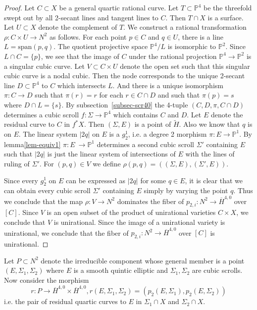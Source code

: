 \documentclass[amssymb,twoside,12 pt,amscd,reqno]{amsart}
\theoremstyle{plain}
\theoremstyle{definition}
\newcommand{\PP}{\mathbb{P}}
\def\ps{\vspace{4pt}}
\begin{document}
\begin{proof}
Let $C\subset X$ be a general quartic rational curve.  Let $T\subset
\PP^4$ be the threefold swept out by all 2-secant lines and tangent
lines to $C$.  Then $T\cap X$ is a surface.  Let $U\subset X$ denote
the complement of $T$.  We construct a rational transformation $\rho:C
\times U \rightarrow N^2$ as follows.  For each point $p\in C$ and
$q\in U$, there is a line $L=\text{span}(p,q)$.  The quotient
projective space $\PP^4/L$ is isomorphic to $\PP^2$.  Since $L\cap C =
\{p\}$, we see that the image of $C$ under the rational projection
$\PP^4 \rightarrow \PP^2$ is a singular cubic curve.  Let $V\subset
C\times U$ denote the open set such that this singular cubic curve is
a nodal cubic.  Then the node corresponds to the unique 2-secant line
$D\subset \PP^4$ to $C$ which intersects $L$.  And there is a unique
isomorphism $\pi:C\rightarrow D$ such that $\pi(r)=r$ for each $r\in
C\cap D$ and such that $\pi(p) = s$ where $D\cap L = \{s\}$.  By
subsection~\ref{subsec-scr40} the 4-tuple $(C,D,\pi,C\cap D)$
determines a cubic scroll 
$f:\Sigma\rightarrow \PP^4$ which contains $C$ and $D$.  Let $E$
denote the residual curve to $C$ in $f^*X$.  Then $(\Sigma,E)$ is a
point of $\widetilde{H}$.  Also we know that $q$ is on $E$.  The
linear system $|2q|$ on $E$ is a $g^1_2$, i.e. a degree 2 morphism
$\pi:E\rightarrow \PP^1$.  By lemma\ref{lem-equiv1}
$\pi:E~\rightarrow \PP^1$ determines
a second cubic scroll 
$\Sigma'$ containing $E$ such that $|2q|$ is just the linear system of 
intersections of $E$ with the lines of ruling of $\Sigma'$.  For
$(p,q)\in V$ we define $\rho(p,q) = ( 
(\Sigma,E), (\Sigma',E))$.

\ps

Since every $g^1_2$ on $E$ can be expressed as $|2q|$ for some $q\in
E$, it is clear that we can obtain every cubic scroll $\Sigma'$
containing $E$ simply by varying the point $q$.  Thus we conclude that
the map $\rho:V\rightarrow N^2$ dominates the fiber of
$p_{2,i}:N^2 \rightarrow \overline{H}^{4,0}$ over $[C]$.  Since
$V$ is an open subset of the product of unirational varieties $C\times
X$, we conclude that $V$ is unirational.  Since the image of a
unirational variety is unirational, we conclude that the fiber of
$p_{2,i}:N^2 \rightarrow \overline{H}^{4,0}$ over $[C]$ is unirational.
\end{proof}

Let $P\subset N^2$ denote the irreducible component whose general
member is a point $(E,\Sigma_1,\Sigma_2)$ where $E$ is a smooth quintic
elliptic and $\Sigma_1,\Sigma_2$ are cubic scrolls.
Now consider the morphism 
\begin{equation}
r:P\rightarrow
\overline{H}^{4,0}\times \overline{H}^{4,0},
r(E,\Sigma_1,\Sigma_2) = (p_2(E,\Sigma_1),p_2(E,\Sigma_2))
\end{equation}
i.e. the pair of residual quartic curves to $E$ in $\Sigma_1\cap X$
and $\Sigma_2 \cap X$.
\end{document}
